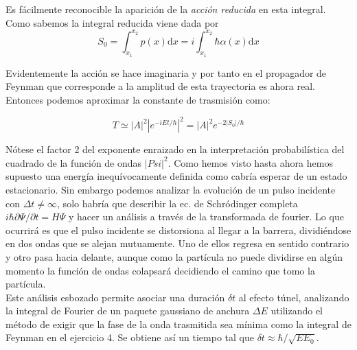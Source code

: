 \documentclass[12pt,a4paper]{article}
\numberwithin{equation}{section}
\numberwithin{figure}{section}
\newcommand{\D}{\mathrm{d}}
\begin{document}
Es fácilmente reconocible la aparición de la \textit{acción reducida} en esta integral. Como sabemos la integral reducida viene dada por $$S_0 = \int_{x_1}^{x_2} p(x) \D x = i \int_{x_1}^{x_2} \hbar \alpha (x) \D x$$ 

Evidentemente la acción se hace imaginaria y por tanto en el propagador de Feynman que corresponde a la amplitud de esta trayectoria es ahora real. Entonces podemos aproximar la constante de trasmisión como:

\begin{equation}
T \simeq |A|^2 \left| e^{-i E t / \hbar } \right|^2 = |A|^2 e^{-2 |S_0|/\hbar}
\end{equation} 

Nótese el factor 2 del exponente enraizado en la interpretación probabilística del cuadrado de la función de ondas $| Psi|^2$. Como hemos visto hasta ahora hemos supuesto una energía inequívocamente definida como cabría esperar de un estado estacionario. Sin embargo podemos analizar la evolución de un pulso incidente con $\Delta t \neq \infty$, solo habría que describir la ec. de Schródinger completa $i \hbar \partial \Psi / \partial t = H \Psi$ y hacer un análisis a través de la transformada de fourier. Lo que ocurrirá es que el pulso incidente se distorsiona al llegar a la barrera, dividiéndose en dos ondas que se alejan mutuamente. Uno de ellos regresa en sentido contrario y otro pasa hacia delante, aunque como la partícula no puede dividirse en algún momento la función de ondas colapsará decidiendo el camino que tomo la partícula. \\

Este análisis esbozado permite asociar una duración $\delta t$ al efecto túnel, analizando la integral de Fourier de un paquete gaussiano de anchura $\Delta E$ utilizando el método de exigir que la fase de la onda trasmitida sea mínima como la integral de Feynman en el ejercicio 4. Se obtiene así un tiempo tal que $\delta t \approx \hbar / \sqrt{E E_0}$. 
\end{document}
